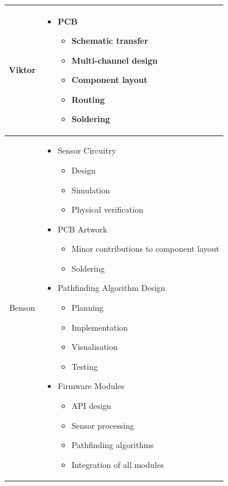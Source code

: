\documentclass[conference]{IEEEtran}
\begin{document}
\begin{tabularx}{\linewidth}{ | c | X | }
	\hline
	Viktor & \begin{itemize}
		         \item PCB
		               \begin{itemize}
			      \item Schematic transfer
			      \item Multi-channel design
			      \item Component layout
			      \item Routing
			      \item Soldering
		      \end{itemize}
	         \end{itemize}     \\
	\hline
	Benson & \begin{itemize}
		         \item Sensor Circuitry
		               \begin{itemize}
			      \item Design
			      \item Simulation
			      \item Physical verification
		      \end{itemize}
		         \item PCB Artwork
		               \begin{itemize}
			      \item Minor contributions to component layout
			      \item Soldering
		      \end{itemize}
		         \item Pathfinding Algorithm Design
		               \begin{itemize}
			      \item Planning
			      \item Implementation
			      \item Visualisation
			      \item Testing
		      \end{itemize}
		         \item Firmware Modules
		               \begin{itemize}
			      \item API design
			      \item Sensor processing
			      \item Pathfinding algorithms
			      \item Integration of all modules
		      \end{itemize}

\end{itemize}
\end{tabularx}
\end{document}
